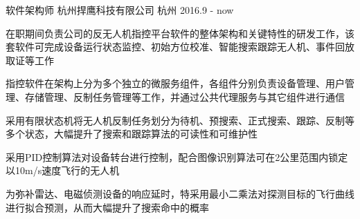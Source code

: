 

\begin{cventries}

  \cventry
    {软件架构师} %
    {杭州捍鹰科技有限公司} %
    {杭州} %
    {2016.9 - now} %
    {
      \begin{cvitems} %
        \item {在职期间负责公司的反无人机指控平台软件的整体架构和关键特性的研发工作，该套软件可完成设备运行状态监控、初始方位校准、智能搜索跟踪无人机、事件回放取证等工作}
        \item {指控软件在架构上分为多个独立的微服务组件，各组件分别负责设备管理、用户管理、存储管理、反制任务管理等工作，并通过公共代理服务与其它组件进行通信}
        \item {采用有限状态机将无人机反制任务划分为待机、预搜索、正式搜索、跟踪、反制等多个状态，大幅提升了搜索和跟踪算法的可读性和可维护性}
        \item {采用PID控制算法对设备转台进行控制，配合图像识别算法可在2公里范围内锁定以10m/s速度飞行的无人机}
        \item {为弥补雷达、电磁侦测设备的响应延时，特采用最小二乘法对探测目标的飞行曲线进行拟合预测，从而大幅提升了搜索命中的概率}
      \end{cvitems}
    }


\end{cventries}

